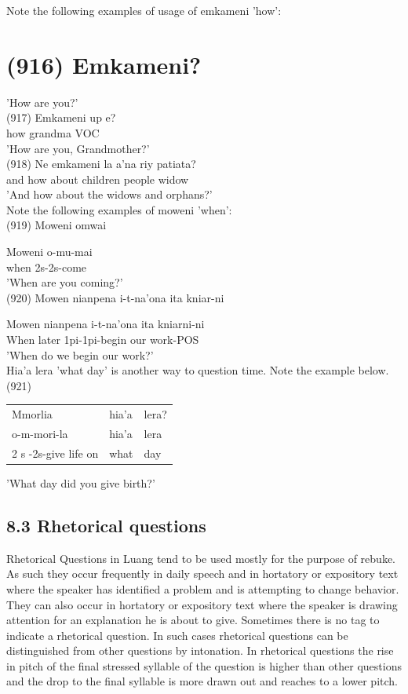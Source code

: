 \documentclass[10pt]{article}
\begin{document}
Note the following examples of usage of emkameni 'how':

\section*{(916) Emkameni?}
'How are you?'\\
(917) Emkameni up e?\\
how grandma VOC\\
'How are you, Grandmother?'\\
(918) Ne emkameni la a'na riy patiata?\\
and how about children people widow\\
'And how about the widows and orphans?'\\
Note the following examples of moweni 'when':\\
(919) Moweni omwai

Moweni o-mu-mai\\
when 2s-2s-come\\
'When are you coming?'\\
(920) Mowen nianpena i-t-na’ona ita kniar-ni

Mowen nianpena i-t-na'ona ita kniarni-ni\\
When later 1pi-1pi-begin our work-POS\\
'When do we begin our work?'\\
Hia'a lera 'what day' is another way to question time. Note the example below.\\
(921)

\begin{center}
\begin{tabular}{lll}
Mmorlia & hia'a & lera? \\
o-m-mori-la & hia'a & lera \\
2 s -2s-give life on & what & day \\
\end{tabular}
\end{center}

'What day did you give birth?'

\subsection*{8.3 Rhetorical questions}
Rhetorical Questions in Luang tend to be used mostly for the purpose of rebuke. As such they occur frequently in daily speech and in hortatory or expository text where the speaker has identified a problem and is attempting to change behavior. They can also occur in hortatory or expository text where the speaker is drawing attention for an explanation he is about to give. Sometimes there is no tag to indicate a rhetorical question. In such cases rhetorical questions can be distinguished from other questions by intonation. In rhetorical questions the rise in pitch of the final stressed syllable of the question is higher than other questions and the drop to the final syllable is more drawn out and reaches to a lower pitch.
\end{document}
